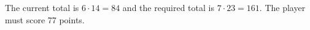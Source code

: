 The current total is $6\cdot14=84$ and the required total is $7\cdot23=161$. The player must score $\boxed{77}$ points.

